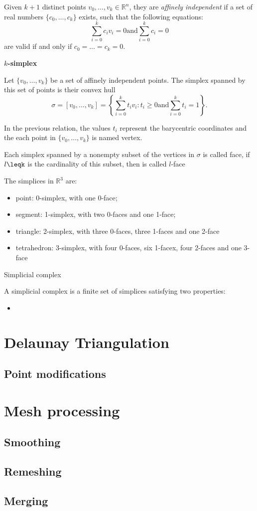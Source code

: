 Given $k + 1$ distinct points $v_0, \dots, v_k \in \mathbb{R}^n$, they are \emph{affinely independent} if a set of real numbers $\{c_0, \dots, c_k \}$ exists, such that the following equations:
\[
\sum_{i=0}^k{c_i v_i} = 0 \text{and} \sum_{i=0}^k{c_i} = 0
\]
are valid if and only if   $c_0 = \dots = c_k = 0$.


\begin{mydef}
 \textbf{$k$-simplex} 
 
 Let $\{v_0, \dots, v_k\}$ be a set of affinely independent points. The simplex spanned by this set of points is their convex hull
 \[
 \sigma = [v_0, \dots, v_k] = \left\{ \sum_{i=0}^{k}{t_i v_i} : t_i \geq 0 \text{and}  \sum_{i=0}^{k}{t_i} = 1\right\}.
 \]
\end{mydef}
In the previous relation, the values $t_i$ represent the barycentric coordinates and the each point in $\{v_0, \dots, v_k\}$ is named vertex.

Each simplex spanned by a nonempty subset of the vertices in $\sigma$ is called face, if $l\leqk$ is the cardinality of this subset, then is called $l$-face

The simplices in $\mathbb{R}^3$ are:
\begin{itemize}
  \item point: 0-simplex, with one 0-face;
  \item segment: 1-simplex, with two 0-faces and one 1-face;
  \item triangle: 2-simplex, with three 0-faces, three 1-faces and one 2-face
  \item tetrahedron: 3-simplex, with four 0-faces, six 1-facex, four 2-faces and one 3-face
\end{itemize}

\begin{mydef}
Simplicial complex

A simplicial complex is a finite set of simplices satisfying two properties:
\begin{itemize}
  \item  
\end{itemize}

\end{mydef}


\section{Delaunay Triangulation}
\subsection{Point modifications}
\section{Mesh processing}
\subsection{Smoothing}
\subsection{Remeshing}
\subsection{Merging}